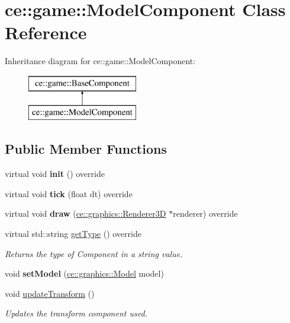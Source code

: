 \hypertarget{classce_1_1game_1_1_model_component}{}\section{ce\+:\+:game\+:\+:Model\+Component Class Reference}
\label{classce_1_1game_1_1_model_component}
Inheritance diagram for ce\+:\+:game\+:\+:Model\+Component\+:\begin{figure}[H]
\begin{center}
\leavevmode
\includegraphics[height=2.000000cm]{classce_1_1game_1_1_model_component}
\end{center}
\end{figure}
\subsection*{Public Member Functions}
\begin{DoxyCompactItemize}
\item 
\mbox{\label{classce_1_1game_1_1_model_component_afbfe9e210796b98160700daea8fd7946}} 
virtual void {\bfseries init} () override
\item 
\mbox{\label{classce_1_1game_1_1_model_component_a36b54a8ccafa5144204671429c490a9a}} 
virtual void {\bfseries tick} (float dt) override
\item 
\mbox{\label{classce_1_1game_1_1_model_component_aed3b814d2bdb0fb99cb280d963379d67}} 
virtual void {\bfseries draw} (\hyperlink{classce_1_1graphics_1_1_renderer3_d}{ce\+::graphics\+::\+Renderer3D} $\ast$renderer) override
\item 
virtual std\+::string \hyperlink{classce_1_1game_1_1_model_component_aaac15cad336e35df7be55dda34f53643}{get\+Type} () override
\begin{DoxyCompactList}\small\item\em Returns the type of Component in a string value. \end{DoxyCompactList}\item 
\mbox{\label{classce_1_1game_1_1_model_component_addc52f099ee60e0018af78c2c98a8751}} 
void {\bfseries set\+Model} (\hyperlink{classce_1_1graphics_1_1_model}{ce\+::graphics\+::\+Model} model)
\item 
void \hyperlink{classce_1_1game_1_1_model_component_a2a7c9d20e9cbeb2e2ad9c4bb3ffec73d}{update\+Transform} ()
\begin{DoxyCompactList}\small\item\em Updates the transform component used. \end{DoxyCompactList}\end{DoxyCompactItemize}
